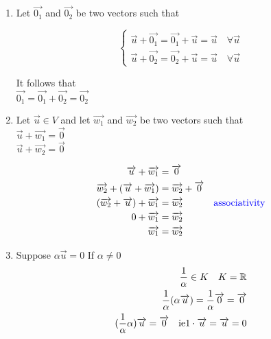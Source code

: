 \documentclass[12pt]{article}
\newcommand{\mathcomment}[0]{\quad\color{blue}}
\renewcommand{\v}[1]{\overrightarrow{#1}}
\newcommand{\real}[0]{\mathbb{R}}
\newenvironment{proof}{\block[Proof]}{\endblock}
\begin{document}
\begin{proof}
	\begin{enumerate}
		\item Let $\v{0_1}$ and $\v{0_2}$ be two vectors such that
		
		
		\begin{equation}
		\begin{cases}
		\v{u} + \v{0_1} = \v{0_1} + \v{u} = \v{u} \quad \forall \v{u} \\
		\v{u} + \v{0_2} = \v{0_2} + \v{u} = \v{u} \quad \forall \v{u}
		\end{cases}
		\end{equation}
		
		It follows that \\
		$\v{0_1} = \v{0_1} + \v{0_2} = \v{0_2}$
		
		\item Let $\v{u} \in V$ and let $\v{w_1}$ and $\v{w_2}$ be two vectors such that \\
		$\v{u} + \v{w_1} = \v{0}$ \\
		$\v{u} + \v{w_2} = \v{0}$
		
		\begin{equation}
		\begin{alignedat}{2}
		\v{u} + \v{w_1} &= \v{0} &\\
		\v{w_2} + (\v{u} + \v{w_1}) &= \v{w_2} + \v{0} &\\
		(\v{w_2} + \v{u}) + \v{w_1} &= \v{w_2} & \mathcomment \text{associativity}\\
		0 + \v{w_1} &= \v{w_2} &\\
		\v{w_1} &= \v{w_2} &
		\end{alignedat}
		\end{equation}
		
		\item Suppose $\alpha \v{u} = 0$ 
		If $\alpha \ne 0$ \\
		
		\begin{equation}
		\begin{alignedat}{2}
		\frac{1}{\alpha} \in K \quad K = \real \\
		\frac{1}{\alpha} (\alpha \v{u}) = \frac{1}{\alpha} \v{0} = \v{0} \\
		(\frac{1}{\alpha} \alpha) \v{u} = \v{0} \text{\quad ie} 1 \cdot \v{u} = \v{u} = 0
		\end{alignedat}
		\end{equation}
		

\end{enumerate}
\end{proof}
\end{document}
